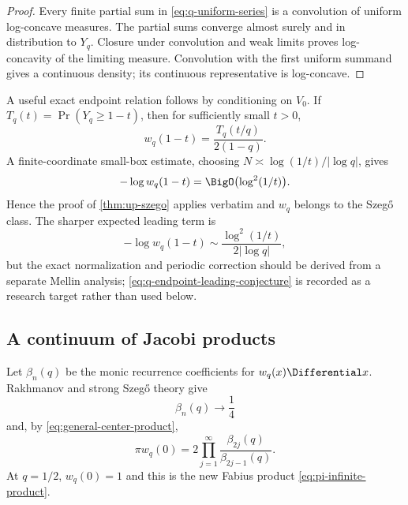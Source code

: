 \documentclass[11pt,oneside]{article}
\theoremstyle{definition}
\theoremstyle{remark}
\numberwithin{equation}{section}
\begin{document}
\begin{proof}
Every finite partial sum in \cref{eq:q-uniform-series} is a convolution of
uniform log-concave measures.  The partial sums converge almost surely and in
distribution to $Y_q$.  Closure under convolution and weak limits proves
log-concavity of the limiting measure.  Convolution with the first uniform
summand gives a continuous density; its continuous representative is
log-concave.
\end{proof}

A useful exact endpoint relation follows by conditioning on $V_0$.  If
$T_q(t)=\Pr(Y_q\ge1-t)$, then for sufficiently small $t>0$,
\begin{equation}
 w_q(1-t)=\frac{T_q(t/q)}{2(1-q)}.
 \label{eq:q-endpoint-density-tail}
\end{equation}
A finite-coordinate small-box estimate, choosing
$N\asymp\log(1/t)/|\log q|$, gives
\begin{equation}
 -\log w_q(1-t)=\BigO\bigl(\log^2(1/t)\bigr).
 \label{eq:q-endpoint-log-square-bound}
\end{equation}
Hence the proof of \cref{thm:up-szego} applies verbatim and $w_q$ belongs to
the Szeg\H{o} class.  The sharper expected leading term is
\begin{equation}
 -\log w_q(1-t)
 \sim\frac{\log^2(1/t)}{2|\log q|},
 \label{eq:q-endpoint-leading-conjecture}
\end{equation}
but the exact normalization and periodic correction should be derived from a
separate Mellin analysis; \cref{eq:q-endpoint-leading-conjecture} is recorded
as a research target rather than used below.

\subsection{A continuum of Jacobi products}
Let $\beta_n(q)$ be the monic recurrence coefficients for
$w_q(x)\Differential x$.  Rakhmanov and strong Szeg\H{o} theory give
\begin{equation}
 \beta_n(q)\longrightarrow\frac14
 \label{eq:q-nevai}
\end{equation}
and, by \cref{eq:general-center-product},
\begin{equation}
 \boxed{
 \pi w_q(0)=2\prod_{j=1}^{\infty}
 \frac{\beta_{2j}(q)}{\beta_{2j-1}(q)}.}
 \label{eq:q-center-product}
\end{equation}
At $q=1/2$, $w_q(0)=1$ and this is the new Fabius product
\cref{eq:pi-infinite-product}.
\end{document}
